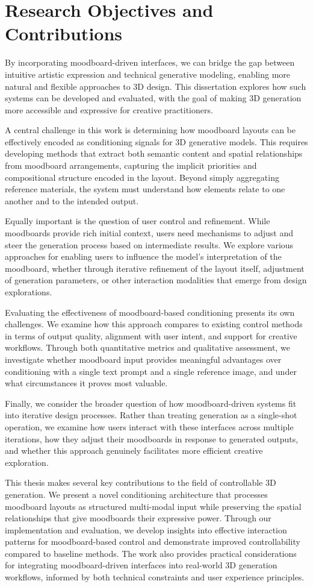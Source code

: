 \section{Research Objectives and Contributions}

By incorporating moodboard-driven interfaces, we can bridge the gap between intuitive artistic expression and technical generative modeling, enabling more natural and flexible approaches to 3D design. This dissertation explores how such systems can be developed and evaluated, with the goal of making 3D generation more accessible and expressive for creative practitioners.

A central challenge in this work is determining how moodboard layouts can be effectively encoded as conditioning signals for 3D generative models. This requires developing methods that extract both semantic content and spatial relationships from moodboard arrangements, capturing the implicit priorities and compositional structure encoded in the layout. Beyond simply aggregating reference materials, the system must understand how elements relate to one another and to the intended output.

Equally important is the question of user control and refinement. While moodboards provide rich initial context, users need mechanisms to adjust and steer the generation process based on intermediate results. We explore various approaches for enabling users to influence the model's interpretation of the moodboard, whether through iterative refinement of the layout itself, adjustment of generation parameters, or other interaction modalities that emerge from design explorations.

Evaluating the effectiveness of moodboard-based conditioning presents its own challenges. We examine how this approach compares to existing control methods in terms of output quality, alignment with user intent, and support for creative workflows. Through both quantitative metrics and qualitative assessment, we investigate whether moodboard input provides meaningful advantages over conditioning with a single text prompt and a single reference image, and under what circumstances it proves most valuable.

Finally, we consider the broader question of how moodboard-driven systems fit into iterative design processes. Rather than treating generation as a single-shot operation, we examine how users interact with these interfaces across multiple iterations, how they adjust their moodboards in response to generated outputs, and whether this approach genuinely facilitates more efficient creative exploration.

This thesis makes several key contributions to the field of controllable 3D generation. We present a novel conditioning architecture that processes moodboard layouts as structured multi-modal input while preserving the spatial relationships that give moodboards their expressive power. Through our implementation and evaluation, we develop insights into effective interaction patterns for moodboard-based control and demonstrate improved controllability compared to baseline methods. The work also provides practical considerations for integrating moodboard-driven interfaces into real-world 3D generation workflows, informed by both technical constraints and user experience principles.